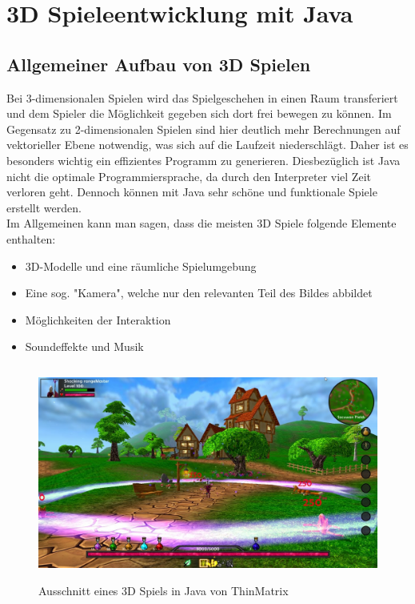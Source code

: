 \chapter{3D Spieleentwicklung mit Java}\label{ch:beispiele}

\section{Allgemeiner Aufbau von 3D Spielen}\label{sec:aufbau}

Bei 3-dimensionalen Spielen wird das Spielgeschehen in einen Raum transferiert und dem Spieler die Möglichkeit gegeben sich dort frei bewegen zu können. \newline
Im Gegensatz zu 2-dimensionalen Spielen sind hier deutlich mehr Berechnungen auf vektorieller Ebene notwendig, was sich auf die Laufzeit niederschlägt. Daher ist es besonders wichtig ein effizientes Programm zu generieren.
Diesbezüglich ist Java nicht die optimale Programmiersprache, da durch den Interpreter viel Zeit verloren geht. \newline
Dennoch können mit Java sehr schöne und funktionale Spiele erstellt werden.
\\
Im Allgemeinen kann man sagen, dass die meisten 3D Spiele folgende Elemente enthalten:
\begin{itemize}
	\item 3D-Modelle und eine räumliche Spielumgebung
	\item Eine sog. "Kamera", welche nur den relevanten Teil des Bildes abbildet
	\item Möglichkeiten der Interaktion
	\item Soundeffekte und Musik
\end{itemize}

\begin{figure}[h!]
		\includegraphics[width=1\linewidth, height = 200pt]{images/3dgame}
		\caption[Beispiel eines 3D Spiels]{Ausschnitt eines 3D Spiels in Java von ThinMatrix \cite{Fig2}}
	
\end{figure}

